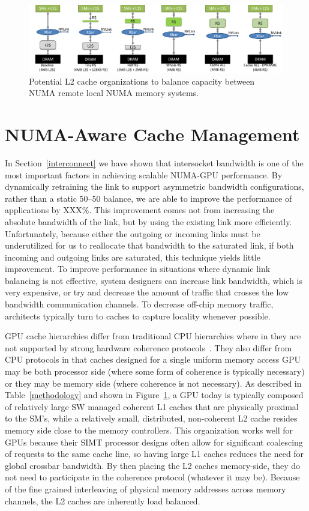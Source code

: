 \begin{figure}[t]
    \centering
    \includegraphics[width=1.0\textwidth]{figures/cache_configurations.pdf}
    \caption{Potential L2 cache organizations to balance capacity between NUMA remote
    local NUMA memory systems.}
    \label{fig:cacheorg}
\end{figure}

\section{NUMA-Aware Cache Management}
\label{caching}
In Section~\ref{interconnect} we have shown that intersocket bandwidth is one
of the most important factors in achieving scalable NUMA-GPU performance. By
dynamically retraining the link to support asymmetric bandwidth configurations,
rather than a static 50--50 balance, we are able to improve the performance
of applications by XXX\%.  This improvement comes not from increasing the
absolute bandwidth of the link, but by using the existing link more efficiently.
Unfortunately, because either the outgoing or incoming links must be underutilized
for us to reallocate that bandwidth to the saturated link,  if both incoming and
outgoing links are saturated, this technique yields little improvement.
To improve performance in situations where dynamic link balancing is not effective,
system designers can increase link bandwidth, which is very expensive,
or try and decrease the amount of traffic that crosses the low bandwidth
communication channels.  To decrease off-chip memory traffic, architects typically
turn to caches to capture locality whenever possible.

GPU cache hierarchies differ from traditional CPU hierarchies where in they are
not supported by strong hardware coherence protocols~\cite{XXX}.  They also differ
from CPU protocols in that caches designed for a single uniform memory access GPU
may be both processor side (where some form of coherence is typically necessary)
or they may be memory side (where coherence is not necessary).  As described in
Table~\ref{methodology} and shown in Figure~\ref{fig:cacheorg}, a GPU today is
typically composed of relatively large SW managed coherent L1 caches that are 
physically proximal to the SM's, while a relatively small, distributed, non-coherent 
L2 cache resides memory side close to the memory controllers.  This
organization works well for GPUs because their SIMT processor designs often allow
for significant coalescing of requests to the same cache line, so having large
L1 caches reduces the need for global crossbar bandwidth.  By then placing the L2
caches memory-side, they do not need to participate in the coherence protocol (whatever
it may be).  Because of the fine grained interleaving of physical memory addresses
across memory channels, the L2 caches are inherently load balanced.

